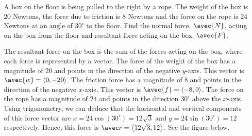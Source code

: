 \documentclass[handout]{ximera}
\begin{document}
\begin{example}
A box on the floor is being pulled to the right by a rope. The weight of the box is $20$ Newtons, the force due to friction is $8$ Newtons and the 
force on the rope is $24$ Newtons at an angle of $30^\circ$ to the floor. Find the normal force, $\avec{N}$, acting on the box from the 
floor and resultant force acting on the box, $\avec{F}$.\\
\begin{image}  
\end{image}


The resultant force on the box is the sum of the forces acting on the box, where each force is represented by a vector.
The force of the weight of the box has a magnitude of $20$ and points in the direction of the negative $y$-axis.  
This vector is $\avec{w} = \vector{0,-20}$.
The friction force has a magnitude of $8$ and points in the direction of the negative $x$-axis.  This vector is $\avec{f} = \vector{-8,0}$.
The force on the rope has a magnitude of $24$ and points in the direction $30^\circ$ above the $x$-axis. 
Using trigonometry, we can deduce that the horizontal and vertical components of this force vector are $x = 24\cos(30^\circ) = 12\sqrt 3$
and $y = 24\sin(30^\circ) = 12$ respectively. Hence, this force is $\avec r = \vector{12\sqrt 3, 12}$.  See the figure below.

\begin{image}
\end{image}


\end{example}
\end{document}
